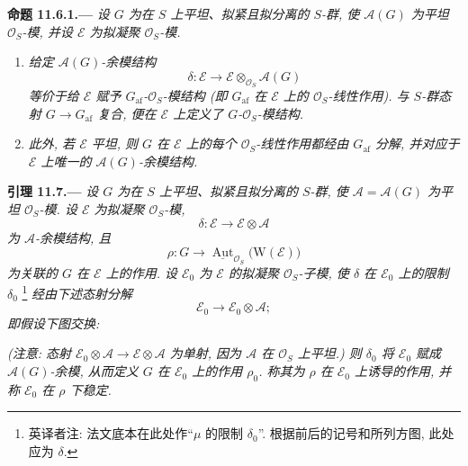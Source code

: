 \medskip
{}\label{prop:sga3-VIB-11.6.1}%
\noindent\textbf{命题 11.6.1.---}
\emph{设 \(G\) 为在 \(S\) 上平坦、拟紧且拟分离的 \(S\)-群,
使 \(\mathcal A(G)\) 为平坦 \(\mathcal O_S\)-模,
并设 \(\mathcal E\) 为拟凝聚 \(\mathcal O_S\)-模.}
\begin{enumerate}
\item[\textup{(i)}]\label{concl:sga3-VIB-11.6.1-i}
  \emph{给定 \(\mathcal A(G)\)-余模结构}
  \[
    \delta:\mathcal E\longrightarrow
      \mathcal E\otimes_{\mathcal O_S}\mathcal A(G)
  \]
  \emph{等价于给 \(\mathcal E\) 赋予 \(G_{\mathrm{af}}\)-\(\mathcal O_S\)-模结构
\textup{(即 \(G_{\mathrm{af}}\) 在 \(\mathcal E\) 上的 \(\mathcal O_S\)-线性作用)}.
与 \(S\)-群态射 \(G\to G_{\mathrm{af}}\) 复合,
便在 \(\mathcal E\) 上定义了 \(G\)-\(\mathcal O_S\)-模结构.}

\item[\textup{(ii)}]\label{concl:sga3-VIB-11.6.1-ii}
  \emph{此外, 若 \(\mathcal E\) 平坦, 则 \(G\) 在 \(\mathcal E\) 上的每个
\(\mathcal O_S\)-线性作用都经由 \(G_{\mathrm{af}}\) 分解,
并对应于 \(\mathcal E\) 上唯一的 \(\mathcal A(G)\)-余模结构.}
\end{enumerate}

\medskip
{}\label{lem:sga3-VIB-11.7}%
\noindent\textbf{引理 11.7.---}
\emph{设 \(G\) 为在 \(S\) 上平坦、拟紧且拟分离的 \(S\)-群,
使 \(\mathcal A=\mathcal A(G)\) 为平坦 \(\mathcal O_S\)-模.
设 \(\mathcal E\) 为拟凝聚 \(\mathcal O_S\)-模,}
\[
  \delta:\mathcal E\longrightarrow\mathcal E\otimes\mathcal A
\]
\emph{为 \(\mathcal A\)-余模结构, 且}
\[
  \rho:G\longrightarrow
  \underline{\operatorname{Aut}}_{\mathcal O_S}
    \bigl(\mathrm W(\mathcal E)\bigr)
\]
\emph{为关联的 \(G\) 在 \(\mathcal E\) 上的作用.
设 \(\mathcal E_0\) 为 \(\mathcal E\) 的拟凝聚 \(\mathcal O_S\)-子模,
使 \(\delta\) 在 \(\mathcal E_0\) 上的限制 \(\delta_0\)}%
\begingroup
\renewcommand{\thefootnote}{\fnsymbol{footnote}}%
\footnote[1]{\label{note:sga3-VIB-11.7-delta-source}
英译者注: 法文底本在此处作``\(\mu\) 的限制 \(\delta_0\)''.
根据前后的记号和所列方图, 此处应为 \(\delta\).}%
\endgroup
\emph{经由下述态射分解}
\[
  \mathcal E_0\longrightarrow\mathcal E_0\otimes\mathcal A;
\]
\emph{即假设下图交换:}
\begin{center}
  \label{diag:sga3-VIB-11.7-stability}%
\end{center}
\emph{\textup{(注意: 态射 \(\mathcal E_0\otimes\mathcal A
  \to\mathcal E\otimes\mathcal A\)
为单射, 因为 \(\mathcal A\) 在 \(\mathcal O_S\) 上平坦.)}
则 \(\delta_0\) 将 \(\mathcal E_0\) 赋成 \(\mathcal A(G)\)-余模,
从而定义 \(G\) 在 \(\mathcal E_0\) 上的作用 \(\rho_0\).
称其为 \(\rho\) 在 \(\mathcal E_0\) 上诱导的作用,
并称 \(\mathcal E_0\) 在 \(\rho\) 下稳定.}

